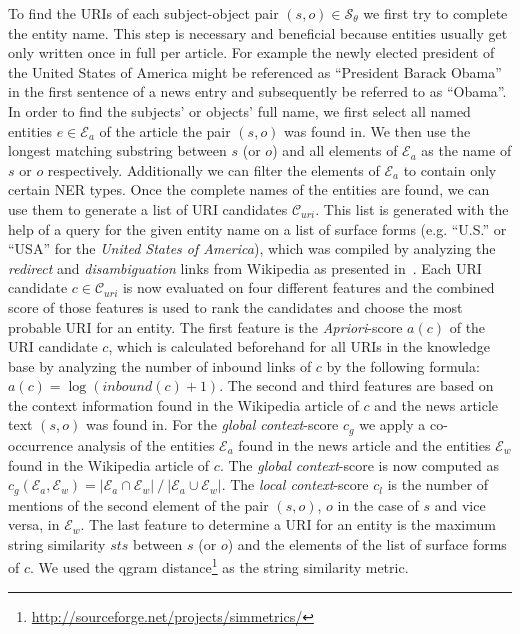 \documentclass[a4paper]{llncs}
\begin{document}
To find the URIs of each subject-object pair $(s,o) \in \mathcal{S_\theta}$ we first try to complete the entity name.
This step is necessary and beneficial because entities usually get only written once in full per article.
For example the newly elected president of the United States of America might be referenced as ``President Barack Obama'' in the first sentence of a news entry and subsequently be referred to as ``Obama''.
In order to find the subjects' or objects' full name, we first select all named entities $e \in \mathcal{E}_a$ of the article the pair $(s,o)$ was found in. We then use the longest matching substring between $s$ (or $o$) and all elements of $\mathcal{E}_a$ as the name of $s$ or $o$ respectively.
Additionally we can filter the elements of $\mathcal{E}_a$ to contain only certain NER types.
Once the complete names of the entities are found, we can use them to generate a list of URI candidates $\mathcal{C}_{uri}$.
This list is generated with the help of a query for the given entity name on a list of surface forms (e.g. ``U.S.'' or ``USA'' for the \emph{United States of America}), which was compiled by analyzing the \emph{redirect} and \emph{disambiguation} links from Wikipedia as presented in~\cite{MEN11}.
Each URI candidate $c \in \mathcal{C}_{uri}$ is now evaluated on four different features and the combined score of those features is used to rank the candidates and choose the most probable URI for an entity.
The first feature is the \emph{Apriori}-score $a(c)$ of the URI candidate $c$, which is calculated beforehand for all URIs in the knowledge base by analyzing the number of inbound links of $c$ by the following formula: $a(c) = \log(inbound(c) + 1)$.
The second and third features are based on the context information found in the Wikipedia article of $c$ and the news article text $(s,o)$ was found in.
For the \emph{global context}-score $c_g$ we apply a co-occurrence analysis of the entities $\mathcal{E}_a$ found in the news article and the entities $\mathcal{E}_w$ found in the Wikipedia article of $c$.
The \emph{global context}-score is now computed as $c_g(\mathcal{E}_a,\mathcal{E}_w) = {|\mathcal{E}_a \cap\mathcal{E}_w|}\:/\:{|\mathcal{E}_a \cup \mathcal{E}_w|}$. 
The \emph{local context}-score $c_l$ is the number of mentions of the second element of the pair $(s,o)$, $o$ in the case of $s$ and vice versa, in $\mathcal{E}_w$.
The last feature to determine a URI for an entity is the maximum string similarity $sts$ between $s$ (or $o$) and the elements of the list of surface forms of $c$.
We used the qgram distance\footnote{\url{http://sourceforge.net/projects/simmetrics/}} as the string similarity metric.
\end{document}
